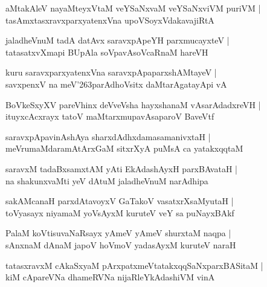 \documentclass[twoside,12pt,openright]{book}
\def\S{\char'263}
\newcounter{shloka}[chapter]
\begin{document}
\begin{shloka}%
aMtakAleV nayaMteyxVtaM veYSaNxvaM veYSaNxviVM puriVM |\\
tasAmxtasxravxparxyatenxVna upoVSoyxVdakavajiRtA
\end{shloka}

\begin{shloka}%
jaladheVnuM tadA datAvx saravxpApeYH parxmucayxteV |\\
tatasatxvXmapi BUpAla soVpavAsoVcaRnaM hareVH 
\end{shloka}

\begin{shloka}%
kuru saravxparxyatenxVna saravxpApaparxshAMtayeV |\\
savxpenxV na meV\S parAdhoVsitx daMtarAgatayApi vA
\end{shloka}

\begin{shloka}%
BoVkeSxyXV pareVhinx deVveVsha hayxshanaM vAsarAdadxreVH |\\
ituyxcAcxrayx tatoV maMtarxmupavAsaparoV BaveVtf
\end{shloka}

\begin{shloka}%
saravxpApavinAshAya sharxdAdhxdamasamanivxtaH |\\
meVrumaMdaramAtArxGaM sitxrXyA puMsA ca yatakxqqtaM
\end{shloka}

\begin{shloka}%
saravxM tadaBxsamxtAM yAti EkAdashAyxH parxBAvataH |\\
na shakunxvaMti yeV dAtuM jaladheVnuM narAdhipa
\end{shloka}

\begin{shloka}%
sakAMcanaH parxdAtavoyxV GaTakoV vasatxrXsaMyutaH |\\
toVyasayx niyamaM yoVsAyxM kuruteV veY sa puNayxBAkf
\end{shloka}

\begin{shloka}%
PalaM koVtisuvaNaRsayx yAmeV yAmeV shurxtaM naqpa |\\
sAnxnaM dAnaM japoV hoVmoV yadasAyxM kuruteV naraH 
\end{shloka}

\begin{shloka}%
tatasxravxM cAkaSxyaM pArxpatxmeVtatakxqqSaNxparxBASitaM |\\
kiM cApareVNa dhameRVNa nijaRleYkAdashiVM vinA
\end{shloka}
\end{document}
